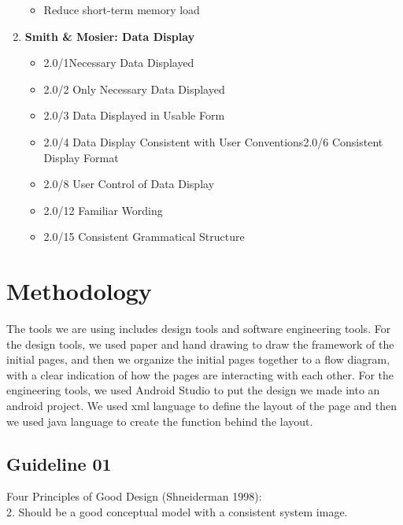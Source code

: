 \documentclass{article}
\begin{document}
\begin{enumerate}
\begin{itemize}
\item Reduce short-term memory load
\end{itemize}
\item{\bf Smith \& Mosier: Data Display}
\begin{itemize}
\item 2.0/1Necessary Data Displayed
\item 2.0/2 Only Necessary Data Displayed
\item 2.0/3 Data Displayed in Usable Form
\item 2.0/4 Data Display Consistent with User Conventions2.0/6 Consistent Display Format
\item 2.0/8 User Control of Data Display
\item 2.0/12 Familiar Wording
\item 2.0/15 Consistent Grammatical Structure
\end{itemize}
\end{enumerate}

\section{Methodology}
The tools we are using includes design tools and software engineering tools.
For the design tools, we used paper and hand drawing to draw the framework of the initial pages, and then we organize
the initial pages together to a flow diagram, with a clear indication of how the pages are interacting with each other.
For the engineering tools, we used Android Studio to put the design we made into an android project. We used xml
language to define the layout of the page and then we used java language to create the function behind the layout.

\subsection{Guideline 01}
Four Principles of Good Design (Shneiderman 1998):\\
2. Should be a good conceptual model with a consistent system image.\\
\end{document}
